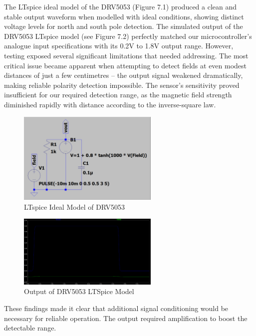 The LTspice ideal model of the DRV5053 (Figure 7.1) produced a clean and stable output waveform when modelled with ideal conditions, showing distinct voltage levels for north and south pole detection. The simulated output of the DRV5053 LTspice model (see Figure 7.2) perfectly matched our microcontroller's analogue input specifications with its 0.2V to 1.8V output range. However, testing exposed several significant limitations that needed addressing. The most critical issue became apparent when attempting to detect fields at even modest distances of just a few centimetres – the output signal weakened dramatically, making reliable polarity detection impossible. The sensor's sensitivity proved insufficient for our required detection range, as the magnetic field strength diminished rapidly with distance according to the inverse-square law.
\begin{figure}[H]
    \centering
    \includegraphics[width=0.6\textwidth]{subpages/images/magnet_model.png}
    \caption{LTspice Ideal Model of DRV5053}
    \label{fig:ideal_model}
\end{figure}
\begin{figure}[H]
    \centering
    \includegraphics[width=0.6\textwidth]{subpages/images/magnet_out.png}
    \caption{Output of DRV5053 LTSpice Model}
    \label{fig:model_output}
\end{figure}
These findings made it clear that additional signal conditioning would be necessary for reliable operation. The output required amplification to boost the detectable range.


